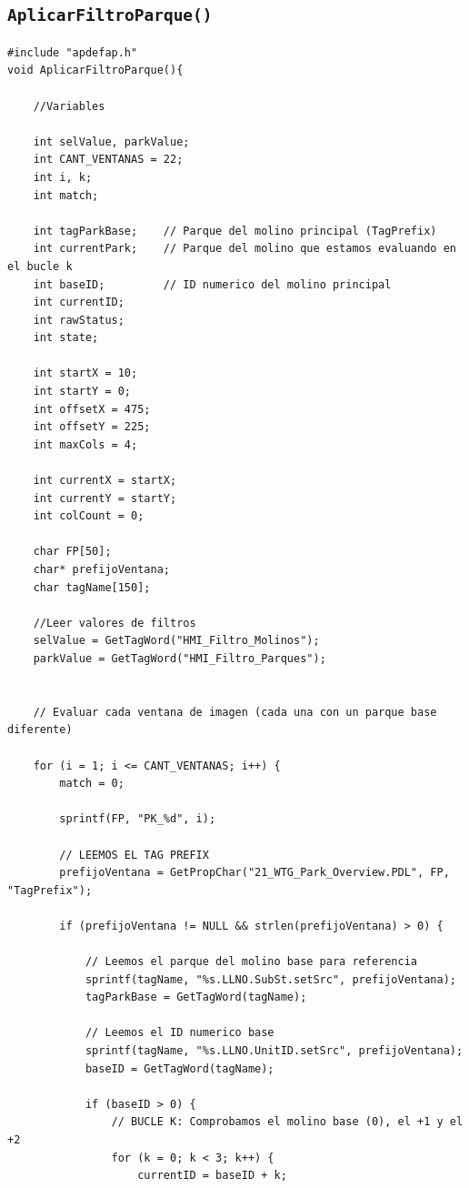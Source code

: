 \subsection{\texttt{AplicarFiltroParque()}}
\begin{lstlisting}
#include "apdefap.h" 
void AplicarFiltroParque(){ 

    //Variables
   
    int selValue, parkValue; 
    int CANT_VENTANAS = 22; 
    int i, k; 
    int match; 

    int tagParkBase;    // Parque del molino principal (TagPrefix)
    int currentPark;    // Parque del molino que estamos evaluando en el bucle k
    int baseID;         // ID numerico del molino principal 
    int currentID;      
    int rawStatus; 
    int state; 

    int startX = 10;    
    int startY = 0;     
    int offsetX = 475;  
    int offsetY = 225;  
    int maxCols = 4; 
    
    int currentX = startX; 
    int currentY = startY; 
    int colCount = 0;  

    char FP[50];  
    char* prefijoVentana; 
    char tagName[150]; 

    //Leer valores de filtros
    selValue = GetTagWord("HMI_Filtro_Molinos"); 
    parkValue = GetTagWord("HMI_Filtro_Parques"); 

  
    // Evaluar cada ventana de imagen (cada una con un parque base diferente)

    for (i = 1; i <= CANT_VENTANAS; i++) { 
        match = 0; 
        
        sprintf(FP, "PK_%d", i); 
        
        // LEEMOS EL TAG PREFIX
        prefijoVentana = GetPropChar("21_WTG_Park_Overview.PDL", FP, "TagPrefix"); 
        
        if (prefijoVentana != NULL && strlen(prefijoVentana) > 0) { 
            
            // Leemos el parque del molino base para referencia
            sprintf(tagName, "%s.LLNO.SubSt.setSrc", prefijoVentana); 
            tagParkBase = GetTagWord(tagName); 
            
            // Leemos el ID numerico base
            sprintf(tagName, "%s.LLNO.UnitID.setSrc", prefijoVentana); 
            baseID = GetTagWord(tagName); 

            if (baseID > 0) {
                // BUCLE K: Comprobamos el molino base (0), el +1 y el +2
                for (k = 0; k < 3; k++) { 
                    currentID = baseID + k; 


\end{lstlisting}
